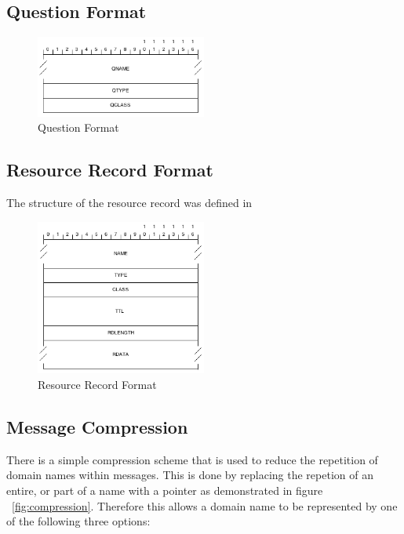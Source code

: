 \documentclass{l3proj}
\begin{document}
\subsection{Question Format}

\begin{figure}[h]
    \centering
    \includegraphics[width=0.5\textwidth]{images/question_format.png}
    \caption{Question Format}
    \label{fig:question_format}
\end{figure}

\subsection{Resource Record Format}

The structure of the resource record was defined in

\begin{figure}[h]
    \centering
    \includegraphics[width=0.5\textwidth]{images/rr_format.png}
    \caption{Resource Record Format}
    \label{fig:rr_format}
\end{figure}

\subsection{Message Compression}

There is a simple compression scheme that is used to reduce the repetition of domain names within messages. This is done by replacing the repetion of an entire, or part of a name with a pointer as demonstrated in figure ~\ref{fig:compression}. Therefore this allows a domain name to be represented by one of the following three options:
\end{document}
